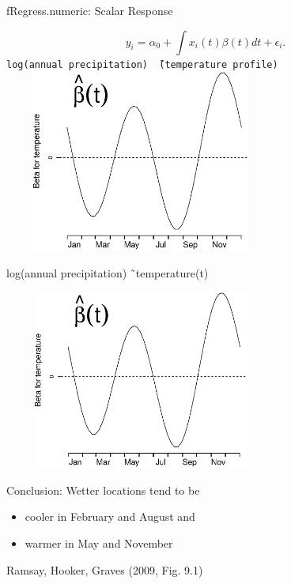 \documentclass[compress]{beamer}
\begin{document}

\begin{frame}{fRegress.numeric:  Scalar Response}

\[ y_i = \alpha_0 + \int x_i(t) \beta(t) d t + \epsilon_i. \]
\texttt{log(annual precipitation) \~\ (temperature profile)}
\includegraphics[height=6cm, width=9cm]{figs/precbeta5b}

\end{frame}


\begin{frame}{log(annual precipitation) \~\ temperature(t) }

\includegraphics[height=5.9cm, width=9cm]{figs/precbeta5b}

Conclusion:  Wetter locations tend to be 
\begin{itemize} 
  \item cooler in February and August and 
  \item warmer in May and November 
\end{itemize} 
Ramsay, Hooker, Graves (2009, Fig. 9.1)

\end{frame}
\end{document}
